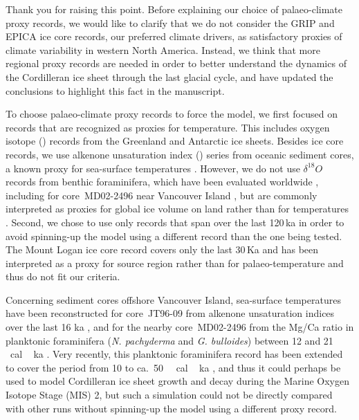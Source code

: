Thank you for raising this point. Before explaining our choice of
palaeo-climate proxy records, we would like to clarify that we do not consider
the GRIP and EPICA ice core records, our preferred climate drivers, as
satisfactory proxies of climate variability in western North America. Instead,
we think that more regional proxy records are needed in order to better
understand the dynamics of the Cordilleran ice sheet through the last glacial
cycle, and have updated the conclusions to highlight this fact in the
manuscript.

To choose palaeo-climate proxy records to force the model, we first focused on
records that are recognized as proxies for temperature. This includes oxygen
isotope () records from the Greenland and Antarctic ice
sheets. Besides ice core records, we use alkenone unsaturation index
() series from oceanic sediment cores, a known proxy for
sea-surface temperatures \citep{Prahl.Wakeham.1987, Prahl.etal.1988,
Muller.etal.1998}. However, we do not use $\delta^{18}O$ records from benthic
foraminifera, which have been evaluated worldwide \citep{Lisiecki.Raymo.2005},
including for core~MD02-2496 near Vancouver Island \citep{Cosma.etal.2008}, but
are commonly interpreted as proxies for global ice volume on land rather than
for temperatures \citep{Shackleton.1967}. Second, we chose to use only records
that span over the last 120\,ka in order to avoid spinning-up the model using a
different record than the one being tested. The Mount Logan ice core
 record covers only the last 30\,Ka and has been interpreted
as a proxy for source region rather than for palaeo-temperature
\citep{Fisher.etal.2004, Fisher.etal.2008} and thus do not fit our criteria.

Concerning sediment cores offshore Vancouver Island, sea-surface temperatures
have been reconstructed for core~JT96-09 from alkenone unsaturation indices
over the last 16 ka \citep{Kienast.McKay.2001}, and for the nearby
core~MD02-2496 from the Mg/Ca ratio in planktonic foraminifera (\emph{N.
pachyderma} and \emph{G. bulloides}) between 12 and
21\,\unit{\,cal\,ka} \citep{Taylor.etal.2014}. Very recently, this
planktonic foraminifera record has been extended to cover the period from 10 to
ca.~50\,\unit{\,cal\,ka} \citep{Taylor.etal.2015}, and thus it
could perhaps be used to model Cordilleran ice sheet growth and decay during
the Marine Oxygen Isotope Stage (MIS) 2, but such a simulation could not be
directly compared with other runs without spinning-up the model using a
different proxy record.

